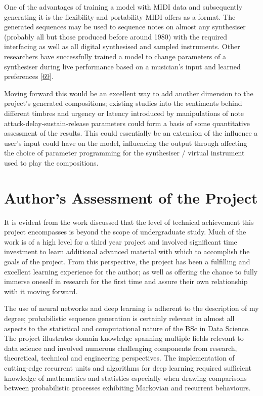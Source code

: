 \documentclass[12pt,]{article}
\begin{document}
One of the advantages of training a model with MIDI data and
subsequently generating it is the flexibility and portability MIDI
offers as a format. The generated sequences may be used to sequence
notes on almost any synthesiser (probably all but those produced before
around 1980) with the required interfacing as well as all digital
synthesised and sampled instruments. Other researchers have successfully
trained a model to change parameters of a synthesiser during live
performance based on a musician's input and learned preferences
{[}\protect\hyperlink{ref-sommer2014towards}{69}{]}.

Moving forward this would be an excellent way to add another dimension
to the project's generated compositions; existing studies into the
sentiments behind different timbres and urgency or latency introduced by
manipulations of note attack-delay-sustain-release parameters could form
a basis of some quantitative assessment of the results. This could
essentially be an extension of the influence a user's input could have
on the model, influencing the output through affecting the choice of
parameter programming for the synthesiser / virtual instrument used to
play the compositions.

\hypertarget{authors-assessment-of-the-project}{%
\section{Author's Assessment of the
Project}\label{authors-assessment-of-the-project}}

It is evident from the work discussed that the level of technical
achievement this project encompasses is beyond the scope of
undergraduate study. Much of the work is of a high level for a third
year project and involved significant time investment to learn
additional advanced material with which to accomplish the goals of the
project. From this perspective, the project has been a fulfilling and
excellent learning experience for the author; as well as offering the
chance to fully immerse oneself in research for the first time and
assure their own relationship with it moving forward.

The use of neural networks and deep learning is adherent to the
description of my degree; probabilistic sequence generation is certainly
relevant in almost all aspects to the statistical and computational
nature of the BSc in Data Science. The project illustrates domain
knowledge spanning multiple fields relevant to data science and involved
numerous challenging components from research, theoretical, technical
and engineering perspectives. The implementation of cutting-edge
recurrent units and algorithms for deep learning required sufficient
knowledge of mathematics and statistics especially when drawing
comparisons between probabilistic processes exhibiting Markovian and
recurrent behaviours.
\end{document}
